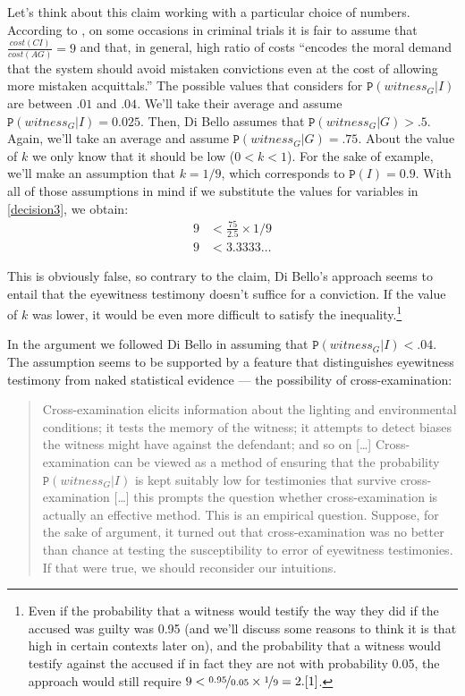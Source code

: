 \documentclass{article}
\newcommand{\pr}[1]{\mbox{$\mathtt{P}(#1)$}}
\begin{document}
Let's think about  this claim working with a particular choice of numbers. According to \citet[11]{dibello2019TrialStatisticsHigh},
on some occasions in criminal trials it is fair to assume that  $\frac{cost(CI)}{cost(AG)} = 9$ and that, in general, high ratio of costs ``encodes the moral demand that the system should avoid mistaken 
convictions even at the cost of allowing more mistaken acquittals.'' 
 The possible values that \citet[29]{dibello2019TrialStatisticsHigh} considers for $\pr{witness_G\vert I}$ are between $.01$ and $.04$. We'll take their average and assume $\pr{witness_G\vert I}=0.025$. 
 Then, Di Bello assumes that $\pr{witness_G\vert G} > .5$. Again, we'll take an average and assume $\pr{witness_G\vert G} = .75$. About the value of $k$ we only know that it should be  low ($0<k<1$). For the sake of example, we'll make an assumption that $k=1/9$, which corresponds to $\pr{I}= 0.9$.
With all of those assumptions in mind if we substitute the values for variables in \eqref{decision3}, we obtain:
\begin{align}\label{eq:concrete} 9 &< \frac{75}{2.5} \times 1/9 \\
 9 & < 3.3333\dots  \nonumber
 \end{align}

\noindent This is obviously false, so contrary to the claim, Di Bello's approach seems to entail  that the eyewitness testimony doesn't suffice for a conviction. If the value of $k$ was  lower, it would be even more difficult to satisfy the inequality.\footnote{Even if the probability that a witness would testify the way they did if the accused was guilty was 0.95 (and we'll discuss some reasons to think it is that high in certain contexts later on), and the probability that a witness would testify against the accused if in fact they are not with probability 0.05, the approach would still require $9< \nicefrac{0.95}{0.05}\times \nicefrac{1}{9} =2.[1]$.}

In the argument we followed Di Bello in assuming that $\pr{witness_G\vert I}<.04$. The assumption seems to be supported by a feature that distinguishes eyewitness testimony from naked statistical evidence --- the possibility of cross-examination:

\begin{quote}
 Cross-examination elicits information about the lighting and environmental conditions; it tests the memory of the witness; it attempts to detect biases the witness might have against the defendant; and so on [\dots] Cross-examination can be viewed as a method of ensuring that the probability $\pr{witness_G\vert I}$  is kept suitably low for testimonies that survive cross-examination [\dots] this prompts the question whether cross-examination is actually an effective method. This is an empirical question. Suppose, for the sake of argument, it turned out that cross-examination was no better than chance at testing the susceptibility to error of eyewitness testimonies. If that were true, we should reconsider our intuitions.

  \citep[26-29]{dibello2019TrialStatisticsHigh} 
\end{quote}
\end{document}
